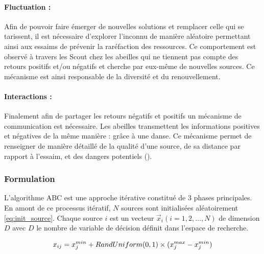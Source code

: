 \paragraph{Fluctuation :} %
\label{par:fluctuation}
Afin de pouvoir faire émerger de nouvelles solutions et remplacer celle qui se
tarissent, il est nécessaire d’explorer l’inconnu de manière aléatoire permettant
ainsi aux essaims de prévenir la raréfaction des ressources. Ce comportement est observé
à travers les Scout chez les abeilles qui ne tiennent pas compte des retours positifs
et/ou négatifs et cherche par eux-même de nouvelles sources. Ce mécanisme est ainsi
responsable de la diversité et du renouvellement.

\paragraph{Interactions :} %
\label{par:intractions}
Finalement afin de partager les retours négatifs et positifs un mécanisme de communication
est nécessaire.
Les abeilles transmettent les informations positives et négatives de la même manière : grâce à une danse.
Ce mécanisme permet de renseigner de manière détaillé de la qualité
d’une source, de sa distance par rapport à l’essaim, et des dangers potentiels
().



\subsubsection{Formulation} %
\label{ssub:formulation}
L’algorithme ABC est une approche itérative constitué de 3 phases principales.
En amont de ce processus itératif, $N$ sources sont initialisées aléatoirement \eqref{eq:init_source}.
Chaque source $i$ est un vecteur $\vec{x}_{i}(i = 1, 2, \dotsc, N)$ de dimension $D$
avec $D$ le nombre de variable de décision définit dans l’espace de recherche.

\begin{equation}\label{eq:init_source}
  x_{ij} = x_{j}^{min} + RandUniform(0, 1) \times (x_{j}^{max} - x_{j}^{min}) \\
\end{equation}

